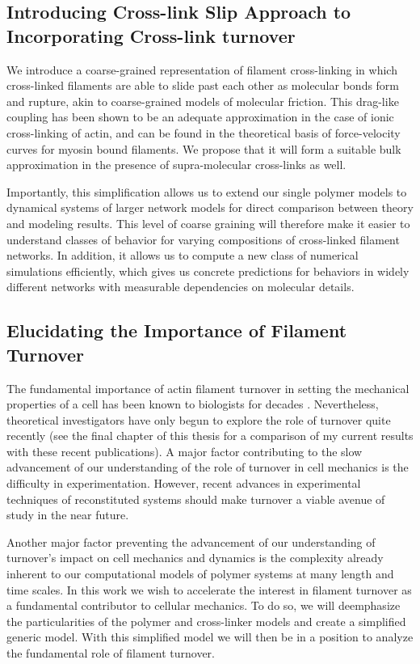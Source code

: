 \subsection{Introducing Cross-link Slip Approach to Incorporating Cross-link turnover}

We introduce a coarse-grained representation of filament cross-linking in which cross-linked filaments are able to slide past each other as molecular bonds form and rupture, akin to coarse-grained models of molecular friction\cite{theo_friction,theo_frictionSam,theo_molefric}.  This drag-like coupling has been shown to be an adequate approximation in the case of ionic cross-linking of actin\cite{mol_fric,theo_hydroish2}, and can be found in the theoretical basis of force-velocity curves for myosin bound filaments\cite{theo_frictionShila}. We propose that it will form a suitable bulk approximation in the presence of supra-molecular cross-links as well.

Importantly, this simplification allows us to extend our single polymer models to dynamical systems of larger network models for direct comparison between theory and modeling results.  This level of coarse graining will therefore make it easier to understand classes of behavior for varying compositions of cross-linked filament networks.  In addition, it allows us to compute a new class of numerical simulations efficiently, which gives us concrete predictions for behaviors in widely different networks with measurable dependencies on molecular details.

\subsection{Elucidating the Importance of Filament Turnover}

The fundamental importance of actin filament turnover in setting the mechanical properties of a cell has been known to biologists for decades \cite{FEB2:FEB20014579387815132}. Nevertheless, theoretical investigators have only begun to explore the role of turnover quite recently \cite{2015arXiv150706182H,Mak:2016aa,10.1371/journal.pone.0000696} (see the final chapter of this thesis for a comparison of my current results with these recent publications). A major factor contributing to the slow advancement of our understanding of the role of turnover in cell mechanics is the difficulty in experimentation.  However, recent advances in experimental techniques of reconstituted systems should make turnover a viable avenue of study in the near future.  

Another major factor preventing the advancement of our understanding of turnover's impact on cell mechanics and dynamics is the complexity already inherent to our computational models of polymer systems at many length and time scales\cite{Mak2015}. In this work we wish to accelerate the interest in filament turnover as a fundamental contributor to cellular mechanics.  To do so, we will deemphasize the particularities of the polymer and cross-linker models and create a simplified generic model.  With this simplified model we will then be in a position to analyze the fundamental role of filament turnover.






